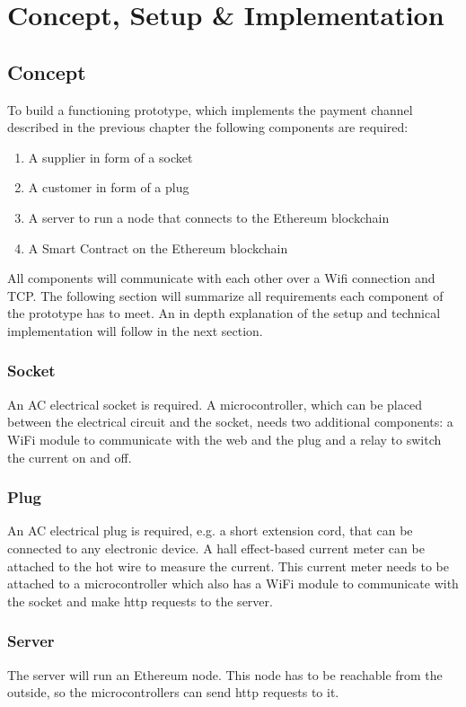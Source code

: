 \section{Concept, Setup \& Implementation}

\subsection{Concept}
To build a functioning prototype, which implements the payment channel described in the previous chapter the following components are required:
\begin{enumerate}
    \item A supplier in form of a socket
    \item A customer in form of a plug
    \item A server to run a node that connects to the Ethereum blockchain
    \item A Smart Contract on the Ethereum blockchain
\end{enumerate}
All components will communicate with each other over a Wifi connection and TCP.
The following section will summarize all requirements each component of the prototype has to meet. An in depth explanation of the setup and technical implementation will follow in the next section.

\subsubsection{Socket}
An AC electrical socket is required. A microcontroller, which can be placed between the electrical circuit and the socket, needs two additional components: a WiFi module to communicate with the web and the plug and a relay to switch the current on and off.

\subsubsection{Plug}
An AC electrical plug is required, e.g. a short extension cord, that can be connected to any electronic device. A hall effect-based current meter can be attached to the hot wire to measure the current. This current meter needs to be attached to a microcontroller which also has a WiFi module to communicate with the socket and make http requests to the server.

\subsubsection{Server}
The server will run an Ethereum node. This node has to be reachable from the outside, so the microcontrollers can send http requests to it.


